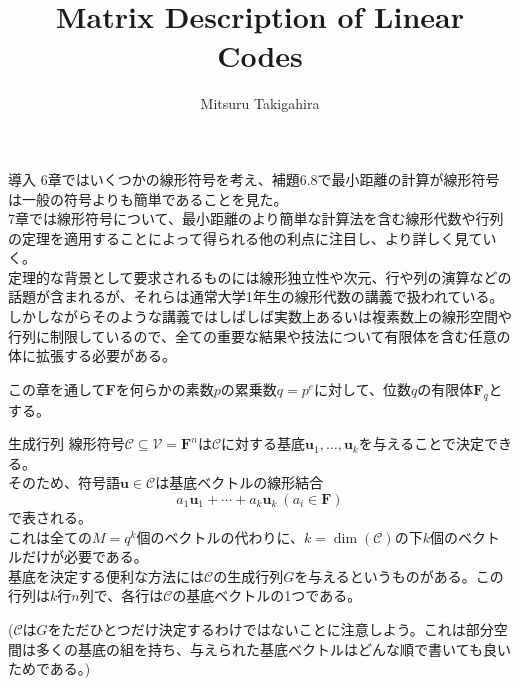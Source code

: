 \documentclass[dvipdfmx,10pt,jsarticle]{beamer}
\title{Matrix Description of Linear Codes}
\author{Mitsuru Takigahira}
\date[2017/11/10]{}
\begin{document}
  \frame{\maketitle}

  \begin{frame}{導入}
    6章ではいくつかの線形符号を考え、補題6.8で最小距離の計算が線形符号は一般の符号よりも簡単であることを見た。 \\
    7章では線形符号について、最小距離のより簡単な計算法を含む線形代数や行列の定理を適用することによって得られる他の利点に注目し、より詳しく見ていく。 \\
    定理的な背景として要求されるものには線形独立性や次元、行や列の演算などの話題が含まれるが、それらは通常大学1年生の線形代数の講義で扱われている。\\
    しかしながらそのような講義ではしばしば実数上あるいは複素数上の線形空間や行列に制限しているので、全ての重要な結果や技法について有限体を含む任意の体に拡張する必要がある。
    
    この章を通して$\mathbf{F}$を何らかの素数$p$の累乗数$q = p^e$に対して、位数$q$の有限体$\mathbf{F}_q$とする。
  \end{frame}
  \begin{frame}{生成行列}
    線形符号$\mathcal{C} \subseteq \mathcal{V} = \mathbf{F}^n$は$\mathcal{C}$に対する基底$\mathbf{u}_1, \ldots, \mathbf{u}_k$を与えることで決定できる。\\ そのため、符号語$\mathbf{u} \in \mathcal{C}$は基底ベクトルの線形結合 \[ a_1 \mathbf{u}_1 + \cdots + a_k \mathbf{u}_k \ (a_i \in \mathbf{F}) \]
    で表される。 \\
    これは全ての$M = q^k$個のベクトルの代わりに、$k = \dim (\mathcal{C})$の下$k$個のベクトルだけが必要である。\\
    基底を決定する便利な方法には$\mathcal{C}$の生成行列$G$を与えるというものがある。この行列は$k$行$n$列で、各行は$\mathcal{C}$の基底ベクトルの1つである。 

    ($\mathcal{C}$は$G$をただひとつだけ決定するわけではないことに注意しよう。これは部分空間は多くの基底の組を持ち、与えられた基底ベクトルはどんな順で書いても良いためである。)
  \end{frame}
\end{document}
